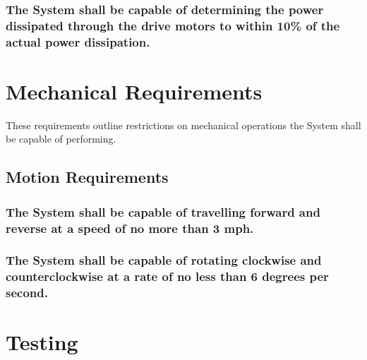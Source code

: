 \documentclass[12pt]{article}
\begin{document}
\subsubsection{The System shall be capable of determining the power dissipated through the drive motors to within 10\% of the actual power dissipation.}

\section{Mechanical Requirements}
These requirements outline restrictions on mechanical operations the System shall be capable of performing.

\subsection{Motion Requirements}
\subsubsection{The System shall be capable of travelling forward and reverse at a speed of no more than 3 mph.}
\subsubsection{The System shall be capable of rotating clockwise and counterclockwise at a rate of no less than 6 degrees per second.}

\section{Testing}
\end{document}
